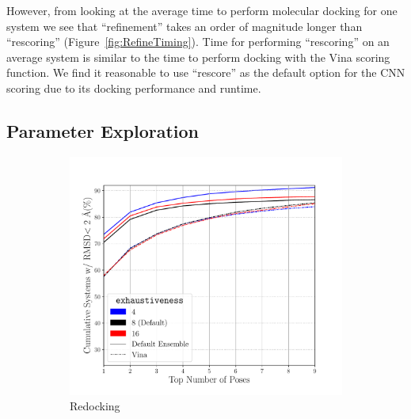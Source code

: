 \documentclass[journal=jcisd8,manuscript=article]{achemso}
\begin{document}
However, from looking at the average time to perform molecular docking for one system we see that ``refinement'' takes an order of magnitude longer than ``rescoring'' (Figure~\ref{fig:RefineTiming}). Time for performing ``rescoring'' on an average system is similar to the time to perform docking with the Vina scoring function. We find it reasonable to use ``rescore'' as the default option for the CNN scoring due to its docking performance and runtime.

\subsection{Parameter Exploration}

\begin{figure}    
        \begin{subfigure}[b]{0.48\textwidth}    
		\centering
		\includegraphics[width=\textwidth]{figures/redocking/sweep_exhaustiveness_line.pdf}
		\caption{Redocking}
		\label{fig:exhaustiveness rd}
        \end{subfigure}    
        \begin{subfigure}[b]{0.48\textwidth}    
		\centering

\end{subfigure}
\end{figure}
\end{document}
